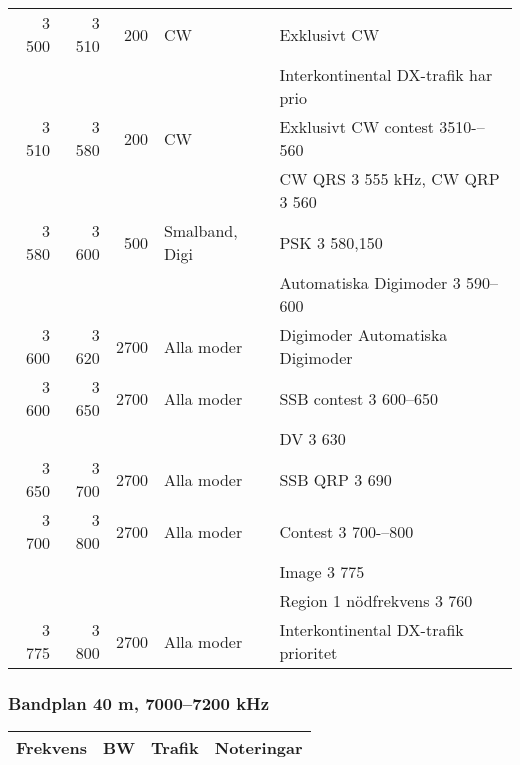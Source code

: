 \begin{landscape}
\begin{tabular}{rrrll}
3 500 & 3 510 & 200  & CW             & Exklusivt CW                         \\ 
      &       &      &                & Interkontinental DX-trafik har prio  \\ \hline
3 510 & 3 580 & 200  & CW             & Exklusivt CW contest 3510-–560       \\ 
      &       &      &                & CW QRS 3 555 kHz, CW QRP 3 560       \\ \hline
3 580 & 3 600 & 500  & Smalband, Digi & PSK 3 580,150                        \\
      &       &      &                & Automatiska Digimoder 3 590--600     \\ \hline
3 600 & 3 620 & 2700 & Alla moder     & Digimoder Automatiska Digimoder      \\ \hline
3 600 & 3 650 & 2700 & Alla moder     & SSB contest 3 600--650               \\
      &       &      &                & DV 3 630                             \\ \hline
3 650 & 3 700 & 2700 & Alla moder     & SSB QRP 3 690                        \\ \hline
3 700 & 3 800 & 2700 & Alla moder     & Contest 3 700-–800                   \\
      &       &      &                & Image 3 775                          \\
      &       &      &                & Region 1 nödfrekvens 3 760           \\ \hline
3 775 & 3 800 & 2700 & Alla moder     & Interkontinental DX-trafik prioritet \\ \hline
\end{tabular}

\subsubsection{Bandplan 40 m, 7000--7200 kHz}
\begin{tabular}{rrrll}
\multicolumn{2}{c}{\textbf{Frekvens}} & \textbf{BW} & \textbf{Trafik} & \textbf{Noteringar} \\ \hline


\end{tabular}
\end{landscape}
